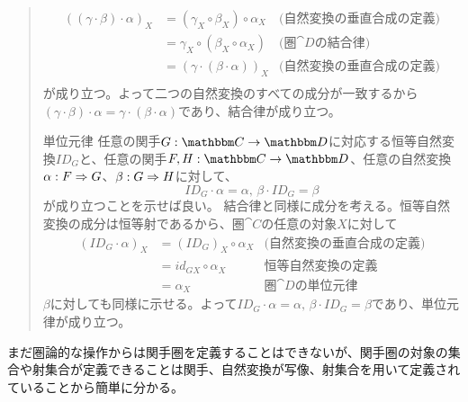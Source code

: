 \begin{define}[関手圏]
\begin{quote}
\begin{mydescription}
        \begin{align*}
          ((\gamma\cdot\beta)\cdot\alpha)_X&=(\gamma_X\circ\beta_X)\circ\alpha_X&\text{(自然変換の垂直合成の定義)}\\
          &=\gamma_X\circ(\beta_X\circ\alpha_X)&\text{(圏$\cat{D}$の結合律)}\\
          &=(\gamma\cdot(\beta\cdot\alpha))_X&\text{(自然変換の垂直合成の定義)}\\
        \end{align*}
        が成り立つ。よって二つの自然変換のすべての成分が一致するから$(\gamma\cdot\beta)\cdot\alpha=\gamma\cdot(\beta\cdot\alpha)$であり、結合律が成り立つ。
				\item[単位元律] 任意の関手$\functor{G}{C}{D}$に対応する恒等自然変換$ID_G$と、任意の関手$\functor{F,H}{C}{D}$、任意の自然変換$\alpha:F\Rightarrow G$、$\beta:G\Rightarrow H$に対して、
        \[ID_G\cdot\alpha=\alpha,\, \beta\cdot ID_G=\beta\]が成り立つことを示せば良い。
				結合律と同様に成分を考える。恒等自然変換の成分は恒等射であるから、圏$\cat{C}$の任意の対象$X$に対して
        \begin{align*}
          (ID_G\cdot\alpha)_X&=(ID_G)_X\circ\alpha_X&\text{(自然変換の垂直合成の定義)}\\
          &=id_{GX}\circ\alpha_X&\text{恒等自然変換の定義}\\
          &=\alpha_X&\text{圏$\cat{D}$の単位元律}
        \end{align*}
        $\beta$に対しても同様に示せる。よって$ID_G\cdot\alpha=\alpha,\, \beta\cdot ID_G=\beta$であり、単位元律が成り立つ。
			\end{mydescription}
		\end{quote}
	\end{define}
  まだ圏論的な操作からは関手圏を定義することはできないが、関手圏の対象の集合や射集合が定義できることは関手、自然変換が写像、射集合を用いて定義されていることから簡単に分かる。

